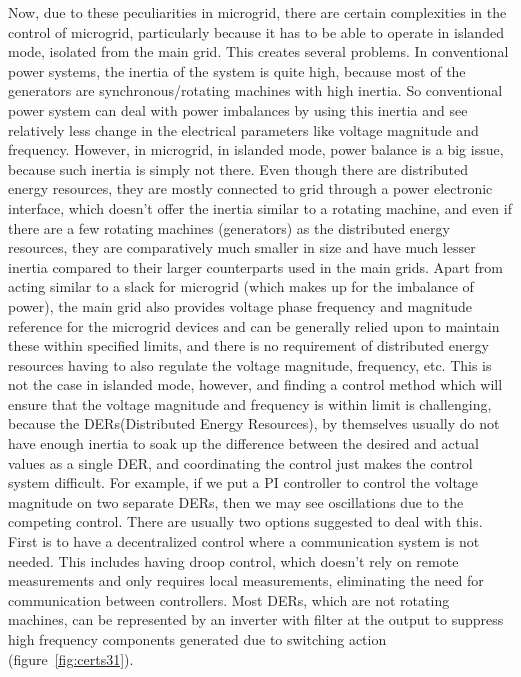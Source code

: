 Now, due to these peculiarities in microgrid, there are certain complexities in the control of microgrid, particularly because it has to be able to operate in islanded mode, isolated from the main grid. This creates several problems. In conventional power systems, the inertia of the system is quite high, because most of the generators are synchronous/rotating machines with high inertia. So conventional power system can deal with power imbalances by using this inertia and see relatively less change in the electrical parameters like voltage magnitude and frequency. However, in microgrid, in islanded mode, power balance is a big issue, because such inertia is simply not there. Even though there are distributed energy resources, they are mostly connected to grid through a power electronic interface, which doesn't offer the inertia similar to a rotating machine, and even if there are a few rotating machines (generators) as the distributed energy resources, they are comparatively much smaller in size and have much lesser inertia compared to their larger counterparts used in the main grids. Apart from acting similar to a slack for microgrid (which makes up for the imbalance of power), the main grid also provides voltage phase frequency and magnitude reference for the microgrid devices and can be generally relied upon to maintain these within specified limits, and there is no requirement of distributed energy resources having to also regulate the voltage magnitude, frequency, etc. This is not the case in islanded mode, however, and finding a control method which will ensure that the voltage magnitude and frequency is within limit is challenging, because the DERs(Distributed Energy Resources), by themselves usually do not have enough inertia to soak up the difference between the desired and actual values as a single DER, and coordinating the control just makes the control system difficult. For example, if we put a PI controller to control the voltage magnitude on two separate DERs, then we may see oscillations due to the competing control. There are usually two options suggested to deal with this. First is to have a decentralized control where a communication system is not needed. This includes having droop control, which doesn't rely on remote measurements and only requires local measurements, eliminating the need for communication between controllers. Most DERs, which are not rotating machines, can be represented by an inverter with filter at the output to suppress high frequency components generated due to switching action (figure~\ref{fig:certs31}).
